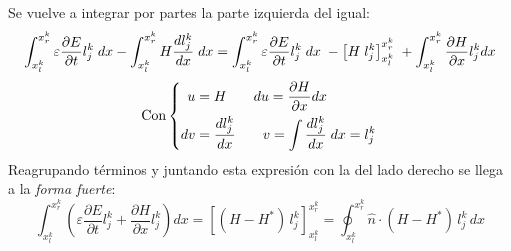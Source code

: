 \documentclass[11pt,a4paper,twoside,pdf]{article}
\numberwithin{equation}{section}
\begin{document}
Se vuelve a integrar por partes la parte izquierda del igual:
\begin{equation}
\int^{x^k_r}_{x^k_l}\varepsilon\frac{\partial E}{\partial t}l_j^k\;dx-\int^{x^k_r}_{x^k_l}H\frac{dl_j^k}{dx}\;dx=\int^{x^k_r}_{x^k_l}\varepsilon\frac{\partial E}{\partial t}l_j^k\;dx \;-\left[H\;l_j^k\right]^{x^k_r}_{x^k_l}\; + \int^{x^k_r}_{x^k_l}\frac{\partial H}{\partial x}l_j^kdx
    \notag    
\end{equation}
\begin{equation}
        \text{Con}
\left\{
\begin{aligned}
u &= H \;\;\;\;\;\;\; du=\frac{\partial H}{\partial x}dx \\
dv &= \frac{d l_j^k}{dx}\;\;\;\;\;\;\; v=\int\frac{dl_j^k}{d x}\;dx=l_j^k
\end{aligned}
\right. \notag
\end{equation}
Reagrupando términos y juntando esta expresión con la del lado derecho se llega a la \textit{forma fuerte}:
\begin{equation}
    \int_{x^k_l}^{x^k_r}\left(\varepsilon\frac{\partial E}{\partial t}l_j^k + \frac{\partial H}{\partial x}l_j^k\right)dx 
= \left[(H - H^*)\, l_j^k\right]_{x^k_l}^{x^k_r} = \displaystyle \oint_{x^k_l}^{x^k_r} \hat{n} \cdot (H - H^*)\, l_j^k\, dx
\end{equation}
\end{document}
